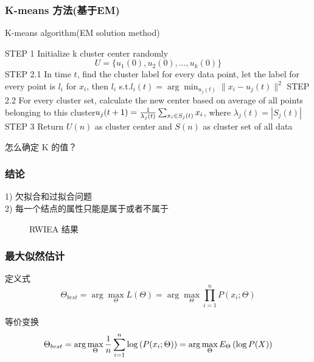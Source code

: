 \documentclass[notheorems, UTF8]{beamer}
\theoremstyle{plain}
\begin{document}
\begin{frame}
\frametitle{K-means 方法(基于EM)}
\begin{algorithm}[H]
\caption{K-means algorithm(EM solution method)}
\begin{algorithmic}
\State STEP 1 Initialize k cluster center randomly
\begin{displaymath}
U = \{u_1(0), u_2(0), \ldots, u_k(0)\}
\end{displaymath}
	\State STEP 2.1 In time $t$, find the cluster label for every data point, let the label for every point is $l_i$ for $x_i$, then $l_i$ s.t.$l_i(t) = \arg\min_{u_j(t)} \|x_i - u_j(t)\|^2$
	\State STEP 2.2 For every cluster set, calculate the new center based on average of all points belonging to this cluster$u_j(t + 1) = {1\over \lambda_j(t)}\sum_{x_i \in S_j(t)} x_i$, where $\lambda_j(t) = |S_j(t)|$
\EndWhile
\State STEP 3 Return $U(n)$ as cluster center and $S(n)$ as cluster set of all data
\end{algorithmic}
\end{algorithm}
\begin{center}
怎么确定 K 的值？
\end{center}
\end{frame}





\begin{frame}
\frametitle{结论}
1) 欠拟合和过拟合问题\\
2) 每一个结点的属性只能是属于或者不属于\\
\begin{figure}[H]
\centering
{}
\caption{RWIEA 结果} \label{fig:1}
\end{figure}
\end{frame}



\begin{frame}
\frametitle{最大似然估计}
定义式
\begin{displaymath}
\Theta_{best} = \arg \max_{\Theta} L(\Theta) = \arg \max_{\Theta} \prod_{i = 1}^{n} P(x_i; \Theta)
\end{displaymath}

等价变换
\begin{displaymath}
\Theta_{best} = \arg \max_{\Theta} {1 \over n} \sum_{i = 1}^{n} \log\left(  P(x_i; \Theta)\right) = \arg \max_{\Theta} E_{\Theta} \left( \log P(X)\right)
\end{displaymath}
\end{frame}
\end{document}
